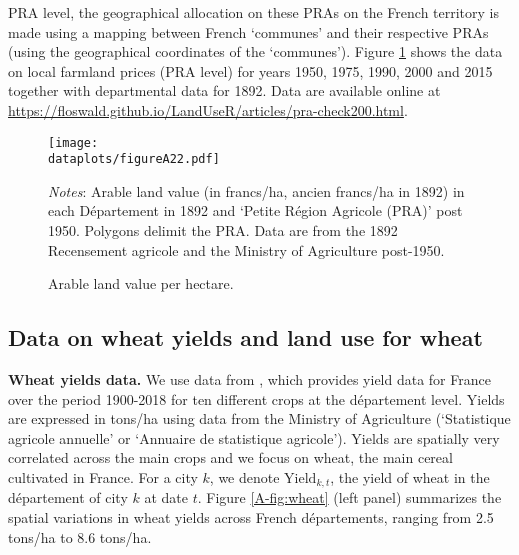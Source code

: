 \documentclass[11pt]{report}
\newcommand{\dataplots}{../output/data/plots}
\begin{document}
PRA level, the geographical allocation on these PRAs on the French territory is made using a mapping between French `communes' and their respective PRAs (using the geographical coordinates of the `communes'). Figure \ref{A-fig:arablevalueall} shows the data on local farmland prices (PRA level) for years 1950, 1975, 1990, 2000 and 2015 together with departmental data for 1892. Data are available online at \url{https://floswald.github.io/LandUseR/articles/pra-check200.html}.


\begin{figure}[h!]
	\begin{adjustbox}{center}
		\texttt{[image: \\dataplots/figureA22.pdf]}
	\end{adjustbox}
	\caption{Arable land value per hectare.}
	\label{A-fig:arablevalueall}
	{\footnotesize \textit{Notes}: Arable land value (in francs/ha, ancien francs/ha in 1892) in each Département in 1892 and `Petite Région Agricole (PRA)' post 1950. Polygons delimit the PRA. Data are from the 1892 Recensement agricole and the Ministry of Agriculture post-1950.}
\end{figure}



\subsection{Data on wheat yields and land use for wheat}\label{A-sec:yields}

\noindent \textbf{Wheat yields data.} We use data from \cite{schaubergeretal2022}, which provides yield data for France over the period 1900-2018 for ten different crops at the département level. Yields are expressed in tons/ha using data from the Ministry of Agriculture (‘Statistique agricole annuelle’ or ‘Annuaire de statistique agricole’). Yields are spatially very correlated across the main crops and we focus on wheat, the main cereal cultivated in France. For a city $k$, we denote $\text{Yield}_{k,t}$, the yield of wheat in the département of city $k$ at date $t$. Figure \ref{A-fig:wheat} (left panel) summarizes the spatial variations in wheat yields across French départements, ranging from 2.5 tons/ha to 8.6 tons/ha. 
\end{document}
